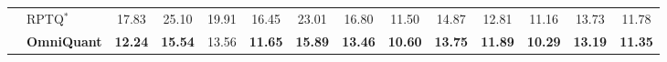 \documentclass{article} %
\begin{document}
\begin{table}[!ht]
{\begin{tabular}{llcccccccccccc}
 & RPTQ$^*$    & 17.83    & 25.10   & 19.91   & 16.45  & 23.01   & 16.80   & 11.50   & 14.87   & 12.81  & 11.16   & 13.73   & 11.78    \\
& \cellcolor{Gray}\textbf{OmniQuant}   & \cellcolor{Gray}\textbf{12.24}  & \cellcolor{Gray}\textbf{15.54}  & \cellcolor{Gray}13.56   & \cellcolor{Gray}\textbf{11.65}  & \cellcolor{Gray}\textbf{15.89}   & \cellcolor{Gray}\textbf{13.46}   & \cellcolor{Gray}\textbf{10.60}   & \cellcolor{Gray}\textbf{13.75}   & \cellcolor{Gray}\textbf{11.89}   & \cellcolor{Gray}\textbf{10.29}   & \cellcolor{Gray}\textbf{13.19}   & \cellcolor{Gray}\textbf{11.35}   \\
\hline
\end{tabular}
}
\end{table}


\end{document}
